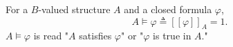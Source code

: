 For a $B$-valued structure $A$ and a closed formula $\varphi$,
$$A \models \varphi \triangleq [\![\varphi]\!]_A = 1.$$
$A \models \varphi$ is read "$A$ satisfies $\varphi$" or "$\varphi$ is true in $A$."
